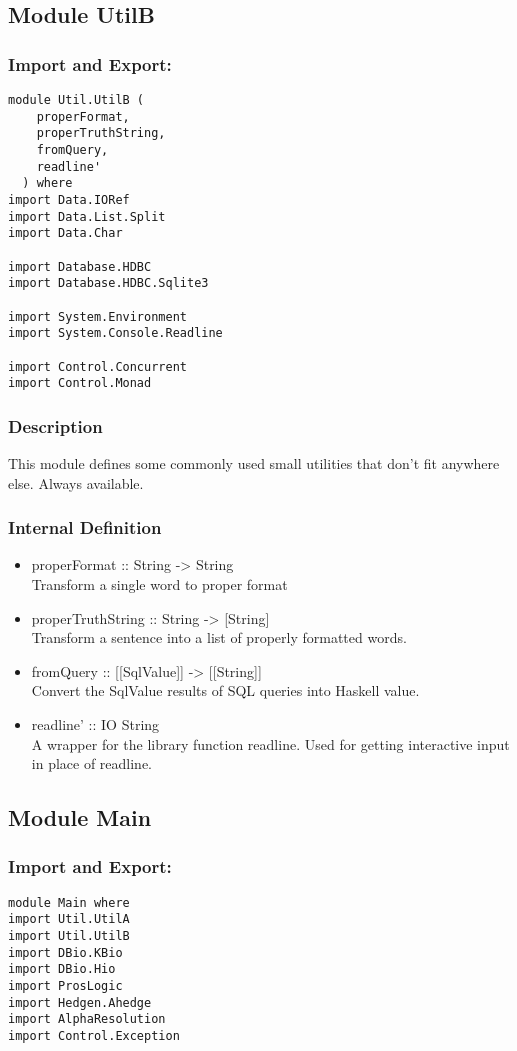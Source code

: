 \documentclass[../gr-final.tex]{subfiles}
\begin{document}
\subsection{Module UtilB}
\subsubsection{Import and Export:}
\begin{lstlisting}
module Util.UtilB (
    properFormat,
    properTruthString,
    fromQuery,
    readline'
  ) where
import Data.IORef
import Data.List.Split
import Data.Char

import Database.HDBC
import Database.HDBC.Sqlite3

import System.Environment
import System.Console.Readline

import Control.Concurrent
import Control.Monad
\end{lstlisting}
\subsubsection{Description}
This module defines some commonly used small utilities that don't
fit anywhere else. Always available.
\subsubsection{Internal Definition}
\begin{itemize}
\item properFormat :: String -> String\\
        Transform a single word to proper format
\item properTruthString :: String -> [String]\\
        Transform a sentence into a list of properly formatted
        words.
\item fromQuery :: [[SqlValue]] -> [[String]]\\
        Convert the SqlValue results of SQL queries into Haskell
        value.
\item readline' :: IO String\\
        A wrapper for the library function readline. Used
        for getting interactive input in place of readline.
\end{itemize}
\subsection{Module Main}
\subsubsection{Import and Export:}
\begin{lstlisting}
module Main where
import Util.UtilA
import Util.UtilB
import DBio.KBio
import DBio.Hio
import ProsLogic
import Hedgen.Ahedge
import AlphaResolution
import Control.Exception
\end{lstlisting}
\end{document}
